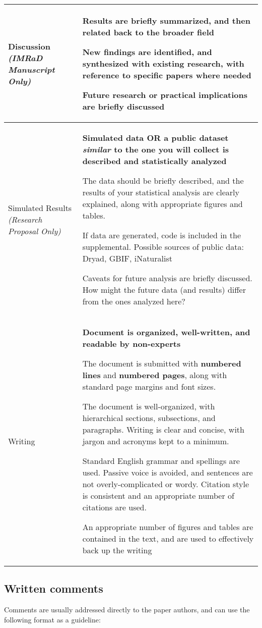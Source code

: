 \documentclass[11pt]{article}
\newcommand{\tabit}{\scriptsize\par\textbullet\phantom{ }}
\begin{document}
\begin{table}[h!]
\begin{tabular}{p{2cm}|p{13cm}}
Discussion \small\emph{(IMRaD Manuscript Only)} & \textbf{Results are briefly summarized, and then related back to the broader field}
\tabit New findings are identified, and synthesized with existing research, with reference to specific papers where needed
\tabit Future research or practical implications are briefly discussed \\ \hline

Simulated Results \small\emph{(Research Proposal Only)} & \textbf{Simulated data \textbf{OR} a public dataset \emph{similar} to the one you will collect is described and statistically analyzed}
\tabit The data should be briefly described, and the results of your statistical analysis are clearly explained, along with appropriate figures and tables.
\tabit If data are generated, code is included in the supplemental. Possible sources of public data: Dryad, GBIF, iNaturalist  
\tabit Caveats for future analysis are briefly discussed. How might the future data (and results) differ from the ones analyzed here?  

\\ \hline

Writing & \textbf{Document is organized, well-written, and readable by non-experts}
  \tabit The document is submitted with \textbf{numbered lines} and \textbf{numbered pages}, along with standard page margins and font sizes. 
  \tabit The document is well-organized, with hierarchical sections, subsections, and paragraphs. Writing is clear and concise, with jargon and acronyms kept to a minimum.
  \tabit Standard English grammar and spellings are used. Passive voice is avoided, and sentences are not overly-complicated or wordy. Citation style is consistent and an appropriate number of citations are used.
  \tabit An appropriate number of figures and tables are contained in the text, and are used to effectively back up the writing \\

\end{tabular}
\end{table}

\subsection*{Written comments}

Comments are usually addressed directly to the paper authors, and can use the following format as a guideline:
\end{document}
